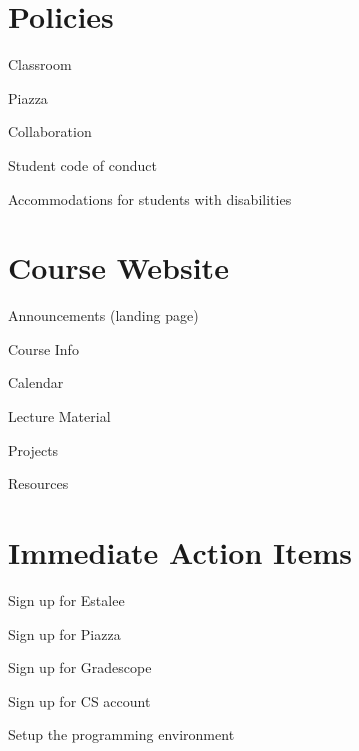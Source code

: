\documentclass[8pt,a4paper,compress]{beamer}
\begin{document}
\section{Policies}
\begin{frame}[fragile]
\pause

Classroom

\pause\bigskip

Piazza

\pause\bigskip

Collaboration

\pause\bigskip

Student code of conduct

\pause\bigskip

Accommodations for students with disabilities
\end{frame}

\section{Course Website}
\begin{frame}[fragile]
\pause

Announcements (landing page)

\pause\bigskip

Course Info

\pause\bigskip

Calendar

\pause\bigskip

Lecture Material 

\pause\bigskip

Projects

\pause\bigskip

Resources
\end{frame}

\section{Immediate Action Items}
\begin{frame}[fragile]
\pause

Sign up for Estalee

\pause\bigskip

Sign up for Piazza

\pause\bigskip

Sign up for Gradescope

\pause\bigskip

Sign up for CS account

\pause\bigskip

Setup the programming environment
\end{frame}
\end{document}
